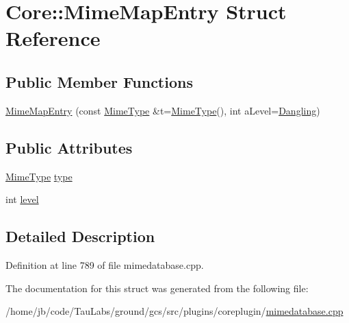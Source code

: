 \hypertarget{struct_core_1_1_mime_map_entry}{\section{\-Core\-:\-:\-Mime\-Map\-Entry \-Struct \-Reference}
\label{struct_core_1_1_mime_map_entry}
}
\subsection*{\-Public \-Member \-Functions}
\begin{DoxyCompactItemize}
\item 
\hyperlink{group___core_plugin_ga53abe7106f23f526e73ccb4b3937bdb7}{\-Mime\-Map\-Entry} (const \hyperlink{class_core_1_1_mime_type}{\-Mime\-Type} \&t=\hyperlink{class_core_1_1_mime_type}{\-Mime\-Type}(), int a\-Level=\hyperlink{group___core_plugin_gga53c997c04f0ea990d88ccbf1b5b98f8ca8312614a0b402ff5e3d6b897d3f84f18}{\-Dangling})
\end{DoxyCompactItemize}
\subsection*{\-Public \-Attributes}
\begin{DoxyCompactItemize}
\item 
\hyperlink{class_core_1_1_mime_type}{\-Mime\-Type} \hyperlink{group___core_plugin_ga4f10a09b24dd7f38aa959a72898cb6f5}{type}
\item 
int \hyperlink{group___core_plugin_gaeaf608ca7c31f9e28c621edd407ea730}{level}
\end{DoxyCompactItemize}


\subsection{\-Detailed \-Description}


\-Definition at line 789 of file mimedatabase.\-cpp.



\-The documentation for this struct was generated from the following file\-:\begin{DoxyCompactItemize}
\item 
/home/jb/code/\-Tau\-Labs/ground/gcs/src/plugins/coreplugin/\hyperlink{mimedatabase_8cpp}{mimedatabase.\-cpp}\end{DoxyCompactItemize}
